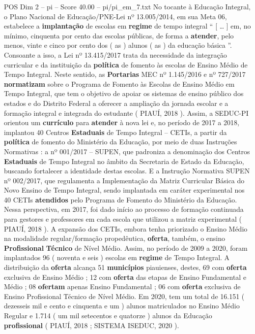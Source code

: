 \begin{textsample}{POS Dim 2 – pi – Score 40.00 – pi/pi\_em\_7.txt}  \label{ex:f2_pos_092}
No tocante à Educação Integral, o Plano Nacional de Educação/PNE-Lei nº 13.005/2014, em sua Meta 06, estabelece a \textbf{implantação} de escolas em \textbf{regime} de tempo integral “ [ … ] em, no mínimo, cinquenta por cento das escolas públicas, de forma a \textbf{atender}, pelo menos, vinte e cinco por cento dos ( as ) alunos ( as ) da educação básica ”.
Consoante a isso, a Lei nº 13.415/2017 trata da necessidade da integração curricular e da instituição da \textbf{política} de fomento às escolas de Ensino Médio de Tempo Integral.
Neste sentido, as \textbf{Portarias} MEC nº 1.145/2016 e nº 727/2017 \textbf{normatizam} sobre o Programa de Fomento às Escolas de Ensino Médio em Tempo Integral, que tem o objetivo de apoiar os sistemas de ensino público dos estados e do Distrito Federal a oferecer a ampliação da jornada escolar e a formação integral e integrada do estudante ( PIAUÍ, 2018 ).
Assim, a SEDUC-PI orientou um \textbf{currículo} para \textbf{atender} à nova lei e, no período de 2017 a 2018, implantou 40 Centros \textbf{Estaduais} de Tempo Integral – CETIs, a partir da \textbf{política} de fomento do Ministério da Educação, por meio de duas Instruções Normativas : a nº 001/2017 – SUPEN, que padroniza a denominação dos Centros \textbf{Estaduais} de Tempo Integral no âmbito da Secretaria de Estado da Educação, buscando fortalecer a identidade destas escolas.
E a Instrução Normativa SUPEN nº 002/2017, que regulamenta a Implementação da Matriz Curricular Básica do Novo Ensino de Tempo Integral, sendo implantada em caráter experimental nos 40 CETIs \textbf{atendidos} pelo Programa de Fomento do Ministério da Educação.
Nessa perspectiva, em 2017, foi dado início ao processo de formação continuada para gestores e professores em cada escola que utilizou a matriz experimental ( PIAUÍ, 2018 ).
A expansão dos CETIs, embora tenha priorizado o Ensino Médio na modalidade regular/formação propedêutica, \textbf{oferta}, também, o ensino \textbf{Profissional} \textbf{Técnico} de Nível Médio.
Assim, no período de 2009 a 2020, foram implantados 96 ( noventa e seis ) escolas em \textbf{regime} de Tempo Integral.
A distribuição da \textbf{oferta} alcança 51 \textbf{municípios} piauienses, destes, 69 com \textbf{oferta} exclusiva de Ensino Médio ; 12 com \textbf{oferta} das etapas de Ensino Fundamental e Médio ; 08 \textbf{ofertam} apenas Ensino Fundamental ; 06 com \textbf{oferta} exclusiva de Ensino Profissional Técnico de Nível Médio.
Em 2020, tem um total de 16.151 ( dezesseis mil e cento e cinquenta e um ) alunos matriculados no Ensino Médio Regular e 1.714 ( um mil setecentos e quatorze ) alunos da Educação \textbf{profissional} ( PIAUÍ, 2018 ; SISTEMA ISEDUC, 2020 ).

\end{textsample}
